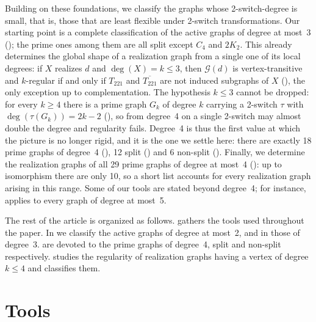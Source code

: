 \documentclass[11pt]{article}
\begin{document}
Building on these foundations, we classify the graphs whose
2-switch-degree is small, that is, those that are least flexible under
2-switch transformations. Our starting point is a complete classification
of the active graphs of degree at most~3
(); the prime
ones among them are all split except $C_4$ and $2K_2$. This already
determines the global shape of a realization graph from a single one of
its local degrees: if $X$ realizes $d$ and $\deg(X)=k\le3$, then
$\mathcal{G}(d)$ is vertex-transitive and $k$-regular if and only if
$T_{221}$ and $\overline{T_{221}}$ are not induced subgraphs of $X$
(), the only exception up to complementation. The
hypothesis $k\le3$ cannot be dropped: for every $k\ge 4$ there is a prime
graph $G_k$ of degree $k$ carrying a 2-switch $\tau$ with
$\deg(\tau(G_k))=2k-2$ (), so from degree~4 on a single
2-switch may almost double the degree and regularity fails. Degree~4 is
thus the first value at which the picture is no longer rigid, and it is
the one we settle here: there are exactly 18 prime graphs of degree~4
(), 12 split
() and 6 non-split
(). Finally, we determine the
realization graphs of all 29 prime graphs of degree at most~4
(): up to isomorphism there are only 10, so
a short list accounts for every realization graph arising in this range.
Some of our tools are stated beyond degree~4; for instance,
 applies to every graph of degree at most~5.

The rest of the article is organized as follows. 
gathers the tools used throughout the paper. In  we
classify the active graphs of degree at most~2, and in 
those of degree~3.  are devoted to the
prime graphs of degree~4, split and non-split respectively.  studies the regularity of
realization graphs having a vertex of degree $k\le4$ and classifies them.


\section{Tools}\label{sec_tools}	
\end{document}
